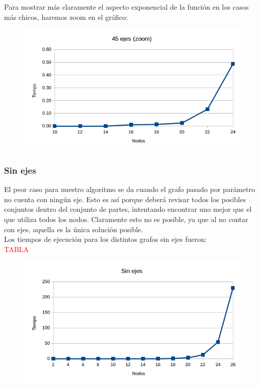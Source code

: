 Para mostrar m\'as claramente el aspecto exponencial de la funci\'on en los casos m\'as chicos, haremos zoom en el gr\'afico:\\

\begin{figure}[h!]
   \begin{center}
 	\includegraphics[scale=0.7]{imagenes/exacto/45Ejes(zoom).png}
   \end{center}
 \end{figure}

\subsubsection{Sin ejes}
El peor caso para nuestro algoritmo se da cuando el grafo pasado por par\'ametro no cuenta con ning\'un eje. Esto es as\'i porque deber\'a revisar todos los posibles conjuntos dentro del conjunto de partes,
intentando encontrar uno mejor que el que utiliza todos los nodos. Claramente esto no es posible, ya que al no contar con ejes, aquella es la \'unica soluci\'on posible.\\

Los tiempos de ejecuci\'on para los distintos grafos sin ejes fueron:\\

\textcolor{red}{TABLA}

   \begin{figure}[h!]
   \begin{center}
 	\includegraphics[scale=0.7]{imagenes/exacto/Vacios.png}
   \end{center}
 \end{figure}
 
